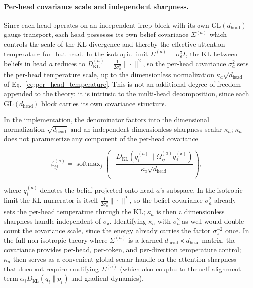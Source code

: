 \documentclass[twoside,11pt]{article}
\begin{document}
\paragraph{Per-head covariance scale and independent sharpness.}
Since each head operates on an independent irrep block with its own $\mathrm{GL}(d_{\text{head}})$ gauge transport, each head possesses its own belief covariance $\Sigma^{(a)}$ which controls the scale of the KL divergence and thereby the effective attention temperature for that head. In the isotropic limit $\Sigma^{(a)} = \sigma_a^2 I$, the KL between beliefs in head $a$ reduces to $D_{\mathrm{KL}}^{(a)} = \frac{1}{2\sigma_a^2}\|\cdot\|^2$, so the per-head covariance $\sigma_a^2$ sets the per-head temperature scale, up to the dimensionless normalization $\kappa_a\sqrt{d_{\text{head}}}$ of Eq.~\eqref{eq:per_head_temperature}. This is not an additional degree of freedom appended to the theory: it is intrinsic to the multi-head decomposition, since each $\mathrm{GL}(d_{\text{head}})$ block carries its own covariance structure.

In the implementation, the denominator factors into the dimensional normalization $\sqrt{d_{\text{head}}}$ and an independent dimensionless sharpness scalar $\kappa_a$; $\kappa_a$ does not parameterize any component of the per-head covariance:

\begin{equation}
\beta_{ij}^{(a)} = \operatorname{softmax}_j \left(-\frac{D_{\mathrm{KL}}(q_i^{(a)} \| \Omega_{ij}^{(a)} q_j^{(a)})}{\kappa_a \sqrt{d_{\text{head}}}}\right),
\label{eq:per_head_temperature}
\end{equation}

where $q_i^{(a)}$ denotes the belief projected onto head $a$'s subspace. In the isotropic limit the KL numerator is itself $\frac{1}{2\sigma_a^2}\|\cdot\|^2$, so the belief covariance $\sigma_a^2$ already sets the per-head temperature through the KL; $\kappa_a$ is then a dimensionless sharpness handle independent of $\sigma_a$. Identifying $\kappa_a$ with $\sigma_a^2$ as well would double-count the covariance scale, since the energy already carries the factor $\sigma_a^{-2}$ once. In the full non-isotropic theory where $\Sigma^{(a)}$ is a learned $d_{\text{head}} \times d_{\text{head}}$ matrix, the covariance provides per-head, per-token, and per-direction temperature control; $\kappa_a$ then serves as a convenient global scalar handle on the attention sharpness that does not require modifying $\Sigma^{(a)}$ (which also couples to the self-alignment term $\alpha_i D_{\mathrm{KL}}(q_i \| p_i)$ and gradient dynamics).
\end{document}
